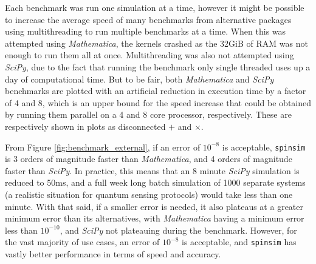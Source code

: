 \documentclass{jors}
\begin{document}
			Each benchmark was run one simulation at a time, however it might be possible to increase the average speed of many benchmarks from alternative packages using multithreading to run multiple benchmarks at a time. When this was attempted using \emph{Mathematica}, the kernels crashed as the 32GiB of RAM was not enough to run them all at once. Multithreading was also not attempted using \emph{SciPy}, due to the fact that running the benchmark only single threaded uses up a day of computational time. But to be fair, both \emph{Mathematica} and \emph{SciPy} benchmarks are plotted with an artificial reduction in execution time by a factor of 4 and 8, which is an upper bound for the speed increase that could be obtained by running them parallel on a 4 and 8 core processor, respectively. These are respectively shown in plots as disconnected \(+\) and \(\times\).

			From Figure \ref{fig:benchmark_external}, if an error of \(10^{-8}\) is acceptable, \texttt{spinsim} is 3 orders of magnitude faster than \emph{Mathematica}, and 4 orders of magnitude faster than \emph{SciPy}. In practice, this means that an 8 minute \emph{SciPy} simulation is reduced to 50ms, and a full week long batch simulation of 1000 separate systems (a realistic situation for quantum sensing protocols) would take less than one minute. With that said, if a smaller error is needed, it also plateaus at a greater minimum error than its alternatives, with \emph{Mathematica} having a minimum error less than \(10^{-10}\), and \emph{SciPy} not plateauing during the benchmark. However, for the vast majority of use cases, an error of \(10^{-8}\) is acceptable, and \texttt{spinsim} has vastly better performance in terms of speed and accuracy.
\end{document}
